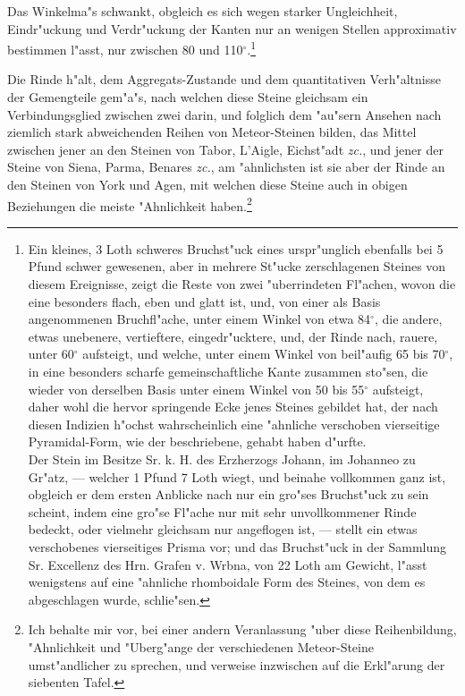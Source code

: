 \documentclass[a4paper, 11pt, oneside, german]{article}
\begin{document}
Das Winkelma"s schwankt, obgleich es sich wegen starker Ungleichheit, Eindr"uckung und Verdr"uckung der Kanten nur an wenigen Stellen approximativ bestimmen l"asst, nur zwischen 80 und 110$^{\circ}$.\footnote{Ein kleines, 3 Loth schweres Bruchst"uck eines urspr"unglich ebenfalls bei 5 Pfund schwer gewesenen, aber in mehrere St"ucke zerschlagenen Steines von diesem Ereignisse, zeigt die Reste von zwei "uberrindeten Fl"achen, wovon die eine besonders flach, eben und glatt ist, und, von einer als Basis angenommenen Bruchfl"ache, unter einem Winkel von etwa 84$^{\circ}$, die andere, etwas unebenere, vertieftere, eingedr"ucktere, und, der Rinde nach, rauere, unter 60$^{\circ}$ aufsteigt, und welche, unter einem Winkel von beil"aufig 65 bis 70$^{\circ}$, in eine besonders scharfe gemeinschaftliche Kante zusammen sto"sen, die wieder von derselben Basis unter einem Winkel von 50 bis 55$^{\circ}$ aufsteigt, daher wohl die hervor springende Ecke jenes Steines gebildet hat, der nach diesen Indizien h"ochst wahrscheinlich eine "ahnliche verschoben vierseitige Pyramidal-Form, wie der beschriebene, gehabt haben d"urfte.\\
Der Stein im Besitze Sr. k. H. des Erzherzogs Johann, im Johanneo zu Gr"atz, --- welcher 1 Pfund 7 Loth wiegt, und beinahe vollkommen ganz ist, obgleich er dem ersten Anblicke nach nur ein gro"ses Bruchst"uck zu sein scheint, indem eine gro"se Fl"ache nur mit sehr unvollkommener Rinde bedeckt, oder vielmehr gleichsam nur angeflogen ist, --- stellt ein etwas verschobenes vierseitiges Prisma vor; und das Bruchst"uck in der Sammlung Sr. Excellenz des Hrn. Grafen v. Wrbna, von 22 Loth am Gewicht, l"asst wenigstens auf eine "ahnliche rhomboidale Form des Steines, von dem es abgeschlagen wurde, schlie"sen.}

Die Rinde h"alt, dem Aggregats-Zustande und dem quantitativen Verh"altnisse der Gemengteile gem"a"s, nach welchen diese Steine gleichsam ein Verbindungsglied zwischen zwei darin, und folglich dem "au"sern Ansehen nach ziemlich stark abweichenden Reihen von Meteor-Steinen bilden, das Mittel zwischen jener an den Steinen von Tabor, L'Aigle, Eichst"adt \emph{zc.}, und jener der Steine von Siena, Parma, Benares \emph{zc.}, am "ahnlichsten ist sie aber der Rinde an den Steinen von York und Agen, mit welchen diese Steine auch in obigen Beziehungen die meiste "Ahnlichkeit haben.\footnote{Ich behalte mir vor, bei einer andern Veranlassung "uber diese Reihenbildung, "Ahnlichkeit und "Uberg"ange der verschiedenen Meteor-Steine umst"andlicher zu sprechen, und verweise inzwischen auf die Erkl"arung der siebenten Tafel.}
\end{document}
